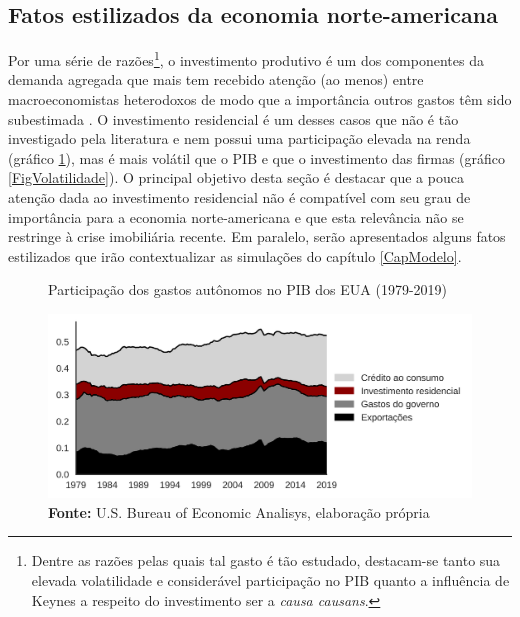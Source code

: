 \subsection{Fatos estilizados da economia norte-americana}\label{FatosEUA}

Por uma série de razões\footnote{Dentre as razões pelas quais tal gasto é tão estudado, destacam-se tanto sua elevada volatilidade e considerável participação no PIB quanto a influência de Keynes a respeito do investimento ser a \textit{causa causans}.}, o investimento produtivo é um dos componentes da demanda agregada que mais tem recebido atenção (ao menos) entre macroeconomistas heterodoxos de modo que a importância outros gastos têm sido subestimada \cite{brochier_macroeconomics_2017}.
O investimento residencial é um desses casos que não é tão investigado pela literatura e nem possui uma participação elevada na renda (gráfico \ref{FigAutonomos}), mas é mais volátil que o PIB e que o investimento das firmas (gráfico \ref{FigVolatilidade}). 
O principal objetivo desta seção é destacar que a pouca atenção dada ao investimento residencial não é compatível com seu grau de importância para a economia norte-americana e que esta relevância não se restringe à crise imobiliária recente.
Em paralelo, serão apresentados alguns fatos estilizados que irão contextualizar as simulações do capítulo \ref{CapModelo}.




\begin{figure}[H]
	\centering
	\caption{Participação dos gastos autônomos no PIB dos EUA (1979-2019)}
	\label{FigAutonomos}
	\includegraphics[width=\textwidth]{../../Dados/Fatos_Estilizados/figs/Gastos_autonomos.png}
	\caption*{\textbf{Fonte:} U.S. Bureau of Economic Analisys, elaboração própria}
\end{figure}


